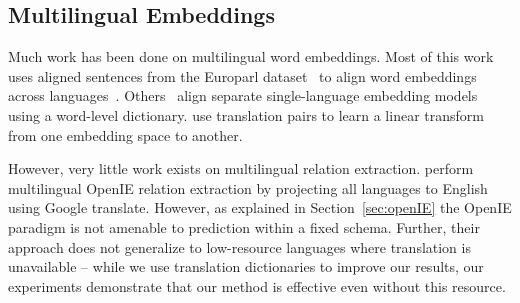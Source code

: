 \subsection{Multilingual Embeddings \label{sec:background-multilingual}}
Much work has been done on multilingual word embeddings.
Most of this work uses aligned sentences from the Europarl dataset~\citep{koehn2005europarl} to align word embeddings across languages~\citep{Gouws2015,luong2015bilingual,hermann2014multilingual}.
Others~\citep{mikolov2013,faruqui2014retrofitting} align separate single-language embedding models using a word-level dictionary.
\citet{mikolov2013} use translation pairs to learn a linear transform from one embedding space to another.


However, very little work exists on multilingual relation extraction. \citet{faruqui2015multilingual} perform multilingual OpenIE relation extraction by projecting all languages to English using Google translate. However, as explained in Section~\ref{sec:openIE} the OpenIE paradigm is not amenable to prediction within a fixed schema. Further, their approach does not generalize to low-resource languages where translation is unavailable -- while we use translation dictionaries to improve our results, our experiments demonstrate that our method is effective even without this resource.











